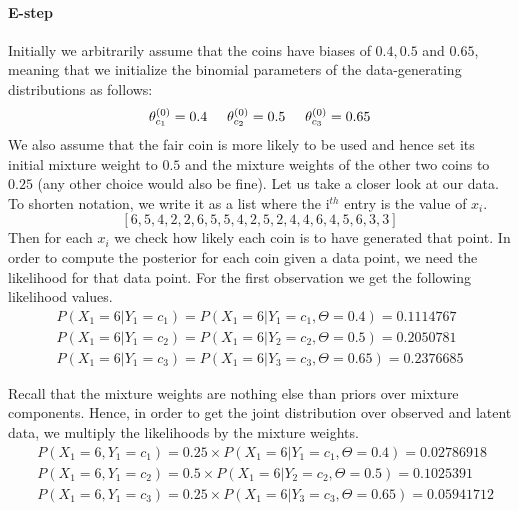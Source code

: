 \documentclass[a4paper,11pt,leqno]{report}\usepackage[]{graphicx}\usepackage[]{color}
\begin{document}
\paragraph{E-step} Initially we arbitrarily assume that the coins have biases of $ 0.4, 0.5 $ and $ 0.65 $, meaning that we initialize the binomial parameters of the data-generating
distributions as follows:
\begin{equation}
\theta^{(0)}_{c_{1}} = 0.4 \hskip 0.5cm  \theta^{(0)}_{c_{2}} = 0.5 \hskip 0.5cm  \theta^{(0)}_{c_{3}} = 0.65
\end{equation}
We also assume that the fair coin is more likely to be used and hence set its initial mixture weight to $ 0.5 $ and the mixture weights of the 
other two coins to $ 0.25 $ (any other choice would also be fine). Let 
us take a closer look at our data. To shorten notation, we write it as a list where the i$ ^{th} $ entry is the value of $ x_{i} $.
$$ [6, 5, 4, 2, 2, 6, 5, 5, 4, 2, 5, 2, 4, 4, 6, 4, 5, 6, 3, 3 ] $$ 
Then for each $ x_{i} $ we check how likely each coin is to have generated that point. In order to compute the posterior for each coin given a data point, we need
the likelihood for that data point. For the first observation we get the following likelihood values.
\begin{align}
&P(X_{1}=6|Y_{1} = c_{1}) = P(X_{1}=6|Y_{1}=c_{1},\Theta = 0.4) = 0.1114767& \\
&P(X_{1}=6|Y_{1} = c_{2}) = P(X_{1}=6|Y_{2}=c_{2},\Theta = 0.5) = 0.2050781& \nonumber \\ 
&P(X_{1}=6|Y_{1} = c_{3}) = P(X_{1}=6|Y_{3}=c_{3},\Theta = 0.65) = 0.2376685& \nonumber
\end{align}

Recall that the mixture weights are nothing else than priors over mixture components. Hence, in order to get the joint distribution over observed and
latent data, we multiply the likelihoods by the mixture weights.
\begin{align}
&P(X_{1}=6,Y_{1} = c_{1}) = 0.25 \times P(X_{1}=6|Y_{1}=c_{1},\Theta = 0.4) = 0.02786918 \\
&P(X_{1}=6,Y_{1} = c_{2}) = 0.5 \times P(X_{1}=6|Y_{2}=c_{2},\Theta= 0.5)  = 0.1025391 \nonumber \\ 
&P(X_{1}=6,Y_{1} = c_{3}) =  0.25 \times P(X_{1}=6|Y_{3}=c_{3},\Theta = 0.65)  = 0.05941712 \nonumber
\end{align}
\end{document}
